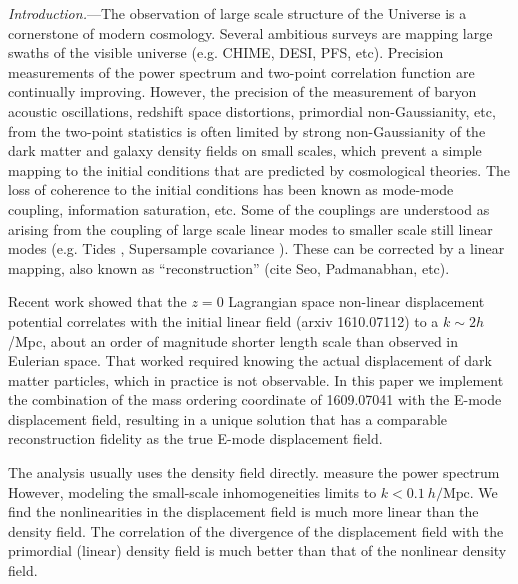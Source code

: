 \documentclass[aps,prd,twocolumn,superscriptaddress,groupedaddress,nofootinbib]{revtex4}  %
\newcommand{\mr}{\mathrm}
\begin{document}
\pacs{}
\maketitle


{\it Introduction.}---The observation of large scale structure of the 
Universe is a cornerstone of modern cosmology.  
Several ambitious surveys are mapping large swaths of the
visible universe (e.g. CHIME, DESI, PFS, etc).  
Precision measurements of the power spectrum and two-point correlation 
function are continually improving.
However, the precision of the measurement of baryon acoustic oscillations, 
redshift space distortions, primordial non-Gaussianity, etc,
from the two-point statistics is often limited by strong non-Gaussianity
of the dark matter and galaxy density fields on small scales, which prevent 
a simple mapping to the
initial conditions that are predicted by cosmological theories.  The
loss of coherence to the initial conditions has been known as
mode-mode coupling, information saturation, etc.
Some of the couplings are understood as arising from the coupling of
large scale linear modes to smaller scale still linear modes
(e.g. Tides \cite{2012tides1,2016tides2}, Supersample covariance \cite{2014sc3}).  These can be corrected by a
linear mapping, also known as ``reconstruction'' \cite{2007bao}(cite Seo, Padmanabhan,
etc).

Recent work showed that the $z=0$ Lagrangian space non-linear
displacement potential correlates with the initial linear field (arxiv
1610.07112) to a $k\sim 2h$/Mpc, about an order of magnitude shorter
length scale than observed in Eulerian space.  That worked required
knowing the actual displacement of dark matter particles, which in
practice is not observable.  In this paper we implement the
combination of the mass ordering coordinate of 1609.07041 with the
E-mode displacement field, resulting in a unique solution that has a
comparable reconstruction fidelity as the true E-mode displacement field.

The analysis usually uses the density field directly. measure the power spectrum
However, modeling the small-scale inhomogeneities limits to $k<0.1\ h/\mr{Mpc}$.
We find the nonlinearities in the displacement field is much more linear than 
the density field. The correlation of the divergence of the displacement field
with the primordial (linear) density field is much better than that of the 
nonlinear density field. 
\end{document}
